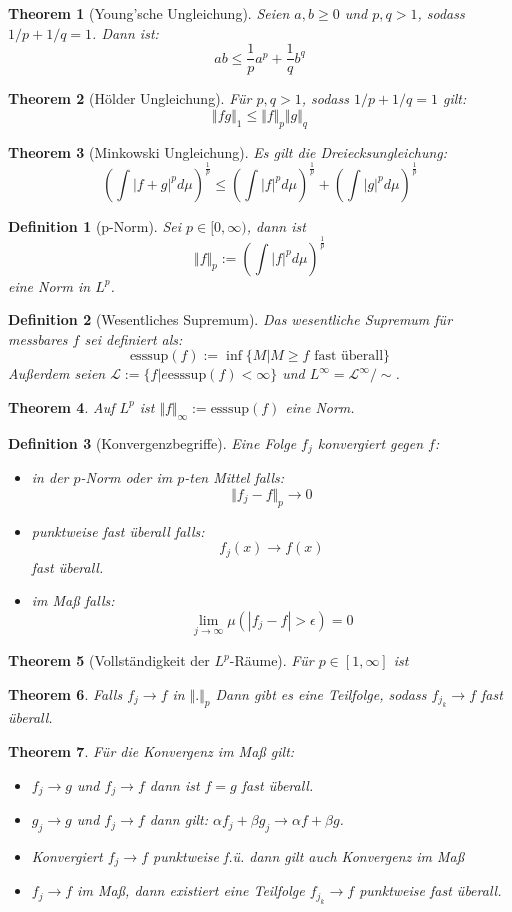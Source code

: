 \documentclass[10pt,a4paper]{article}
\newtheorem{theorem}{Theorem}
\newtheorem{definition}{Definition}
\begin{document}
\begin{theorem}[Young'sche Ungleichung]
	Seien $a, b \geq 0$ und $p, q > 1$, sodass $1/p + 1/q =1$. Dann ist: $$ab \leq \frac{1}{p}a^p+\frac{1}{q}b^q$$
\end{theorem}
\begin{theorem}[Hölder Ungleichung]
	Für $p, q > 1$, sodass $1/p + 1/q =1$ gilt:
	$$\Vert fg\Vert_1 \leq \Vert f\Vert_p \Vert g \Vert_q$$
\end{theorem}
\begin{theorem}[Minkowski Ungleichung]
	Es gilt die Dreiecksungleichung:
	$$(\int |f+g|^pd\mu)^{\frac{1}{p}} \leq (\int |f|^pd\mu)^{\frac{1}{p}} + (\int |g|^pd\mu)^{\frac{1}{p}}$$
\end{theorem}
\begin{definition}[p-Norm]
	Sei $p\in [0, \infty)$, dann ist $$\Vert f \Vert_p := (\int |f|^pd\mu)^{\frac{1}{p}}$$
	eine Norm in $L^p$.
\end{definition}
\begin{definition}[Wesentliches Supremum]
	Das wesentliche Supremum für messbares $f$ sei definiert als:
	$$\text{esssup}(f) := \inf\{M | M \geq f \text{ fast überall}\}$$
	Außerdem seien $\mathcal{L}:=\{f|e\text{esssup}(f)< \infty\}$ und $L^\infty = \mathcal{L}^\infty/\sim$.
\end{definition}
\begin{theorem}
	Auf $L^p$ ist $\Vert f\Vert_\infty := \text{esssup}(f)$ eine Norm.
\end{theorem}
\begin{definition}[Konvergenzbegriffe]
	Eine Folge $f_j$ konvergiert gegen $f$:
	\begin{itemize}
		\item in der $p$-Norm oder im $p$-ten Mittel falls:
		$$\Vert f_j -f\Vert_p \to 0$$
		\item punktweise fast überall falls:
		$$f_j (x) \to f(x)$$
		fast überall.
		\item im Maß falls:
		$$\lim_{j\to \infty} \mu(|f_j - f |> \epsilon) = 0$$
	\end{itemize}
\end{definition}
\begin{theorem}[Vollständigkeit der $L^p$-Räume]
	Für $p \in [1, \infty]$ ist 
\end{theorem}
\begin{theorem}
	Falls $f_j \to f$ in $\Vert . \Vert_p$ Dann gibt es eine Teilfolge, sodass $f_{j_k} \to f$ fast überall. 
\end{theorem}
\begin{theorem}
	Für die Konvergenz im Maß gilt:
	\begin{itemize}
		\item $f_j \to g$ und $f_j \to f$ dann ist $f=g$ fast überall.
		\item $g_j \to g$ und $f_j \to f$ dann gilt: $\alpha f_j + \beta g_j \to \alpha f + \beta g$.
		\item Konvergiert $f_j \to f$ punktweise f.ü. dann gilt auch Konvergenz im Maß
		\item $f_j \to f$ im Maß, dann existiert eine Teilfolge $f_{j_k} \to f$ punktweise fast überall.
	\end{itemize}
\end{theorem}
\end{document}
